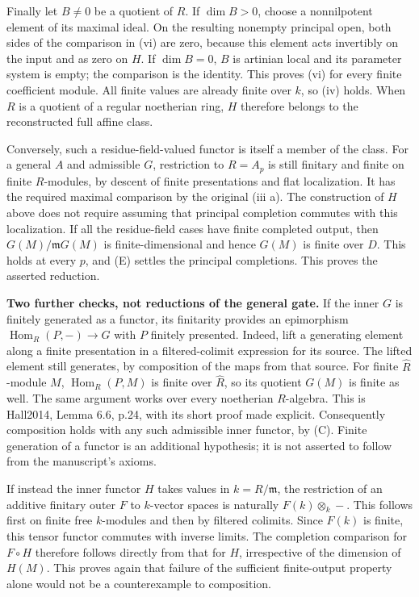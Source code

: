Finally let $B\ne0$ be a quotient of $R$. If $\dim B>0$, choose a
nonnilpotent element of its maximal ideal. On the resulting nonempty
principal open, both sides of the comparison in (vi) are zero, because
this element acts invertibly on the input and as zero on $H$.
If $\dim B=0$, $B$ is artinian local and its parameter system is empty;
the comparison is the identity. This proves (vi) for every finite
coefficient module. All finite values are already finite over $k$,
so (iv) holds. When $R$ is a quotient of a regular noetherian ring,
$H$ therefore belongs to the reconstructed full affine class.

Conversely, such a residue-field-valued functor is itself a member of
the class. For a general $A$ and admissible $G$, restriction to $R=A_p$
is still finitary and finite on finite $R$-modules, by descent of finite
presentations and flat localization. It has the required maximal
comparison by the original (iii a). The construction of $H$ above
does not require assuming that principal completion commutes with this
localization. If all the residue-field cases have finite completed
output, then $G(M)/\mathfrak mG(M)$ is finite-dimensional and hence
$G(M)$ is finite over $D$. This holds at every $p$, and (E) settles
the principal completions. This proves the asserted reduction.

\textbf{Two further checks, not reductions of the general gate.}
If the inner $G$ is finitely generated as a functor, its finitarity
provides an epimorphism $\operatorname{Hom}_R(P,-)\to G$ with $P$
finitely presented. Indeed, lift a generating element along a finite
presentation in a filtered-colimit expression for its source. The lifted
element still generates, by composition of the maps from that source.
For finite $\widehat R$-module $M$, $\operatorname{Hom}_R(P,M)$ is
finite over $\widehat R$, so its quotient $G(M)$ is finite as well.
The same argument works over every noetherian $R$-algebra. This is
Hall2014, Lemma 6.6, p.24, with its short proof made explicit.
Consequently composition holds with any such admissible inner functor,
by (C). Finite generation of a functor is an additional hypothesis;
it is not asserted to follow from the manuscript's axioms.

If instead the inner functor $H$ takes values in $k=R/\mathfrak m$,
the restriction of an additive finitary outer $F$ to $k$-vector spaces
is naturally $F(k)\otimes_k-$. This follows first on finite free
$k$-modules and then by filtered colimits. Since $F(k)$ is finite,
this tensor functor commutes with inverse limits. The completion
comparison for $F\circ H$ therefore follows directly from that for
$H$, irrespective of the dimension of $H(M)$. This proves again that
failure of the sufficient finite-output property alone would not be
a counterexample to composition.

